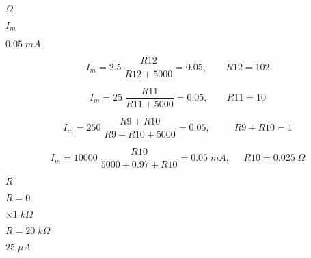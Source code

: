 {\newpage\clearpage
{}%
$\Omega$%
\lthtmlinlinemathZ
\lthtmlcheckvsize\clearpage}

{\newpage\clearpage
{}%
$I_m$%
\lthtmlinlinemathZ
\lthtmlcheckvsize\clearpage}

{\newpage\clearpage
{}%
$0.05\;mA$%
\lthtmlinlinemathZ
\lthtmlcheckvsize\clearpage}

{\newpage\clearpage
{}%
\begin{displaymath}
    I_m=2.5\;\frac{R12}{R12+5000}=0.05,\;\;\;\;\;\;\;R12=102
    \end{displaymath}%
\lthtmldisplayZ
\lthtmlcheckvsize\clearpage}

{\newpage\clearpage
{}%
\begin{displaymath}
    I_m=25\;\frac{R11}{R11+5000}=0.05,\;\;\;\;\;\;\;R11=10
    \end{displaymath}%
\lthtmldisplayZ
\lthtmlcheckvsize\clearpage}

{\newpage\clearpage
{}%
\begin{displaymath}
    I_m=250\;\frac{R9+R10}{R9+R10+5000}=0.05,\;\;\;\;\;\;\;\;\;R9+R10=1
    \end{displaymath}%
\lthtmldisplayZ
\lthtmlcheckvsize\clearpage}

{\newpage\clearpage
{}%
\begin{displaymath}
  I_m=10000\;\frac{R10}{5000+0.97+R10}=0.05\;mA,\;\;\;\;\;
  R10=0.025\;\Omega
  \end{displaymath}%
\lthtmldisplayZ
\lthtmlcheckvsize\clearpage}

{\newpage\clearpage
{}%
$R$%
\lthtmlinlinemathZ
\lthtmlcheckvsize\clearpage}

{\newpage\clearpage
{}%
$R=0$%
\lthtmlinlinemathZ
\lthtmlcheckvsize\clearpage}

{\newpage\clearpage
{}%
$\times 1\;k\Omega$%
\lthtmlinlinemathZ
\lthtmlcheckvsize\clearpage}

{\newpage\clearpage
{}%
$R=20\;k\Omega$%
\lthtmlinlinemathZ
\lthtmlcheckvsize\clearpage}

{\newpage\clearpage
{}%
$25\;\mu A$%
\lthtmlinlinemathZ
\lthtmlcheckvsize\clearpage}

